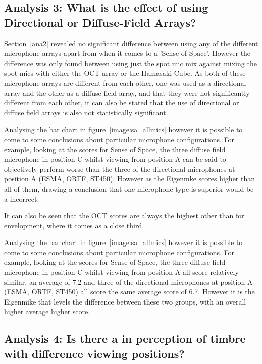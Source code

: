 \documentclass{aes2e}
\begin{document}
	\subsection{Analysis 3: What is the effect of using Directional or Diffuse-Field Arrays?}
	\label{ana3}

		Section~\ref{ana2} revealed no significant difference between using any of the different microphone arrays apart from when it comes to a 'Sense of Space'. However the difference was only found between using just the spot mic mix against mixing the spot mics with either the OCT array or the Hamasaki Cube. As both of these microphone arrays are different from each other, one was used as a directional array and the other as a diffuse field array, and that they were not significantly different from each other, it can also be stated that the use of directional or diffuse field arrays is also not statistically significant.


		Analysing the bar chart in figure~\ref{image:sa_allmics} however it is possible to come to some conclusions about particular microphone configurations. For example, looking at the scores for Sense of Space, the three diffuse field microphone in position C whilst viewing from position A can be said to objectively perform worse than the three of the directional microphones at position A (ESMA, ORTF, ST450). However as the Eigenmke scores higher than all of them, drawing a conclusion that one microphone type is superior would be a incorrect.

		It can also be seen that the OCT scores are always the highest other than for envelopment, where it comes as a close third.

		Analysing the bar chart in figure~\ref{image:sa_allmics} however it is possible to come to some conclusions about particular microphone configurations. For example, looking at the scores for Sense of Space, the three diffuse field microphone in position C whilst viewing from position A all score relatively similar, an average of 7.2 and three of the directional microphones at position A (ESMA, ORTF, ST450) all score the same average score of 6.7. However it is the Eigenmike that levels the difference between these two groups, with an overall higher average higher score. 




	\subsection{Analysis 4: Is there a in perception of timbre with difference viewing positions?}
\end{document}
